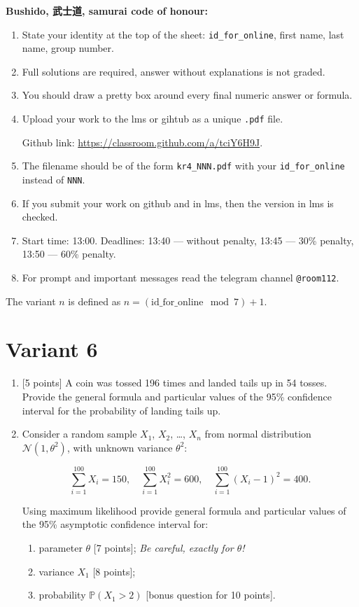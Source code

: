 \documentclass[12pt]{article}
\def \cN{\mathcal{N}}
\def \P{\mathbb{P}}
\newcommand \id {\mathrm{id}\_\mathrm{for}\_\mathrm{online}}
\begin{document}
\textbf{Bushido, 武士道, samurai code of honour:}

\vspace{5mm}

\begin{enumerate}
\item State your identity at the top of the sheet: \verb|id_for_online|, first name, last name, group number.
\item Full solutions are required, answer without explanations is not graded. 
\item You should draw a pretty box around every final numeric answer or formula.
\item Upload your work to the lms or gihtub as a unique \verb|.pdf| file.

Github link: \url{https://classroom.github.com/a/tciY6H9J}.
\item The filename should be of the form \verb|kr4_NNN.pdf| with your \verb|id_for_online| instead of \verb|NNN|.
\item If you submit your work on github and in lms, then the version in lms is checked.
\item Start time: 13:00. Deadlines: 13:40 — without penalty, 13:45 — 30\% penalty, 13:50 — 60\% penalty.
\item For prompt and important messages read the telegram channel \verb|@room112|.
\end{enumerate}


\newpage

The variant $n$ is defined as $n=(\id \mod 7)+1$. 


\section*{Variant 6}
\begin{enumerate}

\item {[5 points]} A coin was tossed 196 times and landed tails up in 54 tosses.
Provide the general formula and particular values
of the 95\% confidence interval for the probability of landing tails up.

\item Consider a random sample $X_1$, $X_2$, \ldots, $X_n$ from normal distribution $\cN(1, \theta^2)$, 
with unknown variance $\theta^2$:

\[
\sum_{i=1}^{100} X_i = 150, \quad \sum_{i=1}^{100} X_i^2 = 600, \quad \sum_{i=1}^{100} (X_i - 1)^2 = 400.  
\]

Using maximum likelihood 
provide general formula and particular values
of the 95\% asymptotic confidence interval for:

\begin{enumerate}
  \item parameter $\theta$ {[7 points]}; \textit{Be careful, exactly for $\theta$!}
  \item variance $X_1$ {[8 points]};
  \item probability $\P(X_1 > 2)$ {[bonus question for 10 points]}.
\end{enumerate}

\end{enumerate}
\end{document}
